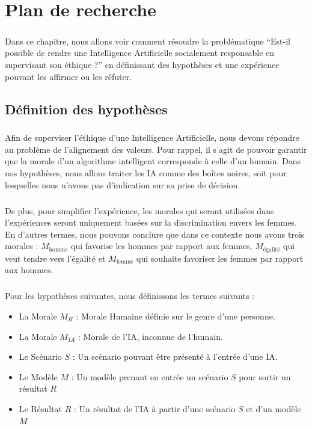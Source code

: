 \documentclass[10pt, french, a4paper]{report}
\begin{document}
\newpage
\chapter{Plan de recherche}

\paragraph{}
Dans ce chapitre, nous allons voir comment résoudre la problématique ``Est-il possible de rendre une Intelligence Artificielle socialement responsable en supervisant son éthique ?'' en définissant des hypothèses et une expérience pouvant les affirmer ou les réfuter.

\section{Définition des hypothèses}

\paragraph{}
Afin de superviser l'éthique d'une Intelligence Artificielle, nous devons répondre au problème de l'alignement des valeurs. Pour rappel, il s'agit de pouvoir garantir que la morale d'un algorithme intelligent corresponde à celle d'un humain. Dans nos hypothèses, nous allons traiter les IA comme des boîtes noires, soit pour lesquelles nous n'avons pas d'indication sur sa prise de décision.

\paragraph{}
De plus, pour simplifier l'expérience, les morales qui seront utilisées dans l'expériences seront uniquement basées sur la discrimination envers les femmes. En d'autres termes, nous pouvons conclure que dans ce contexte nous avons trois morales : $M_{\text{homme}}$ qui favorise les hommes par rapport aux femmes, $M_{\text{égalité}}$ qui veut tendre vers l'égalité et $M_{\text{femme}}$ qui souhaite favoriser les femmes par rapport aux hommes.

\paragraph{}
Pour les hypothèses suivantes, nous définissons les termes suivants :
\begin{itemize}
  \item La Morale $M_H$ : Morale Humaine définie sur le genre d'une personne.
  \item La Morale $M_{IA}$ : Morale de l'IA, inconnue de l'humain.
  \item Le Scénario $S$ : Un scénario pouvant être présenté à l'entrée d'une IA.
  \item Le Modèle $M$ : Un modèle prenant en entrée un scénario $S$ pour sortir un résultat $R$ 
  \item Le Résultat $R$ : Un résultat de l'IA à partir d'une scénario $S$ et d'un modèle $M$
\end{itemize}
\end{document}
